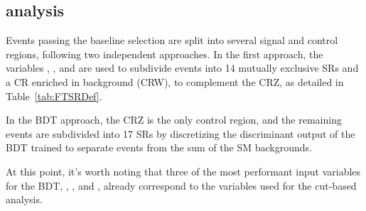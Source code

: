 

\subsection{\smft analysis}

Events passing the \smft baseline selection are split into several signal and
control regions, following two independent approaches. In the first approach,
the variables \Njets, \Nbjets, and \Nleps are used to subdivide events into
14 mutually exclusive SRs and a CR enriched in \ttW background (CRW), to
complement the CRZ, as detailed in Table~\ref{tab:FTSRDef}.

In the BDT approach, the CRZ is the only control
region, and the remaining events are subdivided into 17 SRs by discretizing
the discriminant output of the BDT trained to separate \tttt events from the
sum of the SM backgrounds.

At this point, it's worth noting that 
three of the most performant input variables for the BDT,
\Njets, \Nbjets, and \Nleps, already 
correspond to the variables used for the cut-based analysis.

